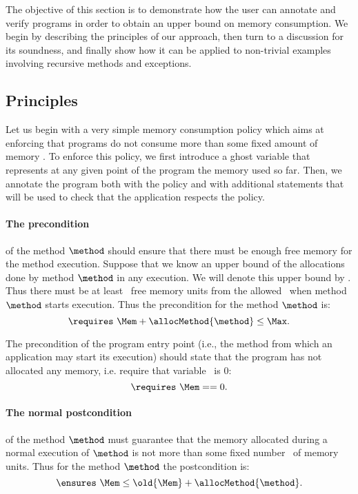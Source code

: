 The objective of this section is to demonstrate how the user can
annotate and verify programs in order to obtain an upper bound on
memory consumption. We begin by describing the principles of our
approach, then turn to a discussion for its soundness, and finally show
how it can be applied to non-trivial examples involving recursive
methods and exceptions.


\subsection{Principles}
Let us begin with a very simple memory consumption policy which aims
at enforcing that  programs do not consume more than
some fixed amount of memory \Max . To enforce this policy, we first
introduce a ghost variable \Mem{} that represents at any given point of
the program the memory used so far. Then, we annotate the program both
with the policy and with additional statements that will be used to
check that the application respects the policy.



\paragraph{The precondition} of the method $\method$ should ensure that
there must be enough free memory for the method execution. Suppose
that we know an upper bound of the allocations done by method $\method$
in any execution. We will denote this upper bound by
\allocMethod{\method}. Thus there must be at least
\allocMethod{\method}\ free memory units from the allowed \Max\ when
method $\method$ starts execution. Thus the precondition for the method
$\method$ is:
$$
\requires \ \Mem + \allocMethod{\method}  \leq \Max.
$$

The precondition of the
program entry point (i.e., the method from which an application
may start its execution) should state that the program has not
allocated any memory, i.e. require that variable \Mem \ is  0:
$$
\requires \ \Mem == 0.
$$
\paragraph{The normal postcondition} of the method $\method$ must
guarantee that the memory allocated during a normal execution of
$\method$ is not more than some fixed number \allocMethod{\method}\
of memory units. Thus for the method $\method$ the postcondition is:
$$
\ensures \  \Mem \leq \old{\Mem} + \allocMethod{\method}.
$$

